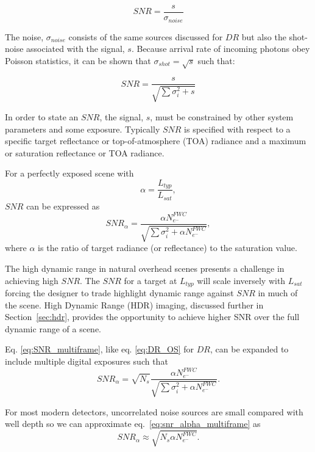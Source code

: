 \documentclass[10pt,journal]{IEEEtran}  %
\begin{document}
\begin{equation*}
    SNR = \frac{s}{\sigma_{noise}}
\end{equation*}

The noise, $\sigma_{noise}$ consists of the same sources discussed for $DR$ but also the shot-noise associated with the signal, $s$.  Because arrival rate of incoming photons obey Poisson statistics, it can be shown that $\sigma_{shot} = \sqrt{s}$ such that:

\begin{equation*}
    SNR = \frac{s}{\sqrt{\sum{\sigma_i^2} + s}}
\end{equation*}

In order to state an $SNR$, the signal, $s$, must be constrained by other system parameters and some exposure.  Typically $SNR$ is specified with respect to a specific target reflectance or top-of-atmosphere (TOA) radiance and a maximum or saturation reflectance or TOA radiance.  

For a perfectly exposed scene with
\begin{equation*}
    \alpha = \frac{L_{typ}}{L_{sat}},
\end{equation*}
${SNR}$ can be expressed as
\begin{equation}
    SNR_{\alpha} = \frac{\alpha N_{e^-}^{FWC}}{\sqrt{\sum{\sigma_i^2} + \alpha N_{e^-}^{FWC}}},
\label{eq:SNR_multiframe}
\end{equation}
where $\alpha$ is the ratio of target radiance (or reflectance) to the saturation value.

The high dynamic range in natural overhead scenes presents a challenge in achieving high $SNR$.  The $SNR$ for a target at $L_{typ}$ will scale inversely with $L_{sat}$ forcing the designer to trade highlight dynamic range against $SNR$ in much of the scene.  High Dynamic Range (HDR) imaging, discussed further in Section~\ref{sec:hdr}, provides the opportunity to achieve higher SNR over the full dynamic range of a scene.

Eq. \eqref{eq:SNR_multiframe}, like eq. \eqref{eq:DR_OS} for $DR$, can be expanded to include multiple digital exposures such that
\begin{equation}
\label{eq:snr_alpha_multiframe}
SNR_{\alpha} = \sqrt{N_s}\frac{\alpha N_{e^-}^{FWC}}{\sqrt{\sum{\sigma_i^2} + \alpha N_{e^-}^{FWC}}}.
\end{equation}

For most modern detectors, uncorrelated noise sources are small compared with well depth so we can approximate eq.~\eqref{eq:snr_alpha_multiframe} as
\begin{equation}
\label{eq:snr_alpha_multiframe_simp}
SNR_{\alpha} \approx \sqrt{N_s \alpha N_{e^-}^{FWC}}.
\end{equation}
\end{document}
